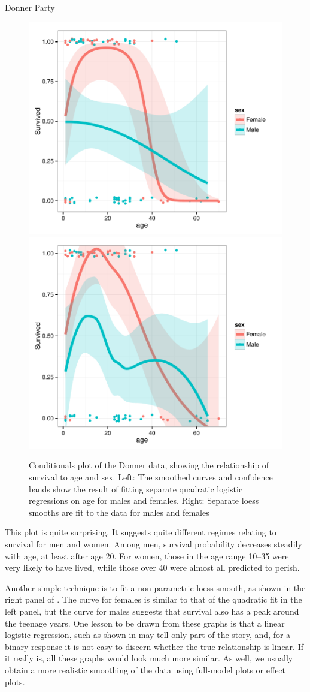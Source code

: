 \documentclass[11pt]{book}
\renewenvironment{knitrout}{\small\renewcommand{\baselinestretch}{.85}}{} %
\begin{document}
\begin{Example}[donner1]{Donner Party}
\begin{knitrout}
\begin{figure}[!htbp]
\centerline{\includegraphics[width=.5\textwidth]{ch07/fig/donner1-cond31} 
\includegraphics[width=.5\textwidth]{ch07/fig/donner1-cond32} }

\caption[Conditionals plot of the Donner data, showing the relationship of survival to age and sex]{Conditionals plot of the Donner data, showing the relationship of survival to age and sex. Left: The smoothed curves and confidence bands show the result of fitting separate quadratic logistic regressions on age for males and females. Right: Separate loess smooths are fit to the data for males and females\label{fig:donner1-cond3}}
\end{figure}


\end{knitrout}
This plot is quite surprising.  It suggests quite different regimes relating to survival
for men and women.  Among men, survival probability decreases steadily with age, at
least after age 20.  For women, those in the age range 10--35 were very likely to have
lived, while those over 40 were almost all predicted to perish.

Another simple technique is to fit a non-parametric loess smooth, as shown in the
right panel of .  The curve for females is similar
to that of the quadratic fit in the left panel, but the curve for males
suggests that survival also has a peak around the teenage years.
One lesson to be drawn from these graphs is that a linear logistic regression,
such as shown in  may tell only part of the story,
and, for a binary response it is not easy to discern whether the true
relationship is linear.  If it really is, all these graphs would look much
more similar.  As well, we usually obtain a more realistic smoothing of
the data using full-model plots or effect plots.



\end{Example}
\end{document}

